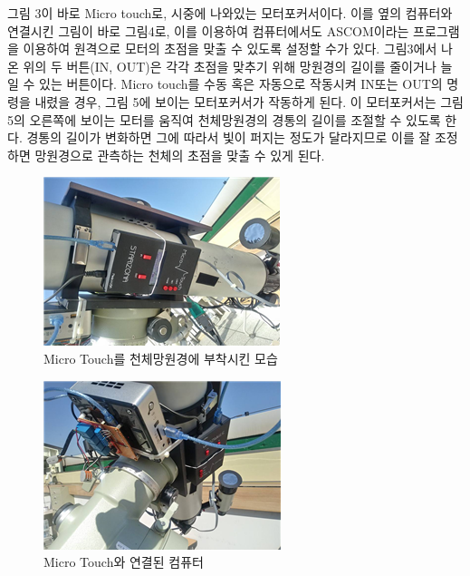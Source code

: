 \documentclass{abstract_hutech}
\begin{document}
그림 3이 바로 Micro touch로, 시중에 나와있는 모터포커서이다. 이를 옆의 컴퓨터와 연결시킨 그림이 바로 그림4로, 이를 이용하여 컴퓨터에서도 ASCOM이라는 프로그램을 이용하여 원격으로 모터의 초점을 맞출 수 있도록 설정할 수가 있다. 그림3에서 나온 위의 두 버튼(IN, OUT)은 각각 초점을 맞추기 위해 망원경의 길이를 줄이거나 늘일 수 있는 버튼이다. Micro touch를 수동 혹은 자동으로 작동시켜 IN또는 OUT의 명령을 내렸을 경우, 그림 5에 보이는 모터포커서가 작동하게 된다. 이 모터포커서는 그림 5의 오른쪽에 보이는 모터를 움직여 천체망원경의 경통의 길이를 조절할 수 있도록 한다. 경통의 길이가 변화하면 그에 따라서 빛이 퍼지는 정도가 달라지므로 이를 잘 조정하면 망원경으로 관측하는 천체의 초점을 맞출 수 있게 된다.
\begin{figure}
\centering
\includegraphics[width=0.7\linewidth]{telescope1}
\caption{Micro Touch를 천체망원경에 부착시킨 모습}
\label{fig:telescope1}
\end{figure}

\begin{figure}
\centering
\includegraphics[width=0.7\linewidth]{telescope2}
\caption{Micro Touch와 연결된 컴퓨터}
\label{fig:telescope2}
\end{figure}
\end{document}
